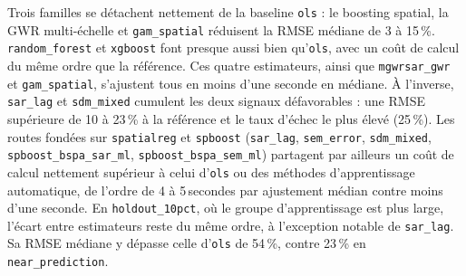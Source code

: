 \documentclass[11pt,a4paper]{article}
\begin{document}
Trois familles se détachent nettement de la baseline \texttt{ols} : le boosting spatial, la GWR multi-échelle et \texttt{gam\_spatial} réduisent la RMSE médiane de 3 à 15\,\%. \texttt{random\_forest} et \texttt{xgboost} font presque aussi bien qu'\texttt{ols}, avec un coût de calcul du même ordre que la référence. Ces quatre estimateurs, ainsi que \texttt{mgwrsar\_gwr} et \texttt{gam\_spatial}, s'ajustent tous en moins d'une seconde en médiane. À l'inverse, \texttt{sar\_lag} et \texttt{sdm\_mixed} cumulent les deux signaux défavorables : une RMSE supérieure de 10 à 23\,\% à la référence et le taux d'échec le plus élevé (25\,\%). Les routes fondées sur \texttt{spatialreg} et \texttt{spboost} (\texttt{sar\_lag}, \texttt{sem\_error}, \texttt{sdm\_mixed}, \texttt{spboost\_bspa\_sar\_ml}, \texttt{spboost\_bspa\_sem\_ml}) partagent par ailleurs un coût de calcul nettement supérieur à celui d'\texttt{ols} ou des méthodes d'apprentissage automatique, de l'ordre de 4 à 5\,secondes par ajustement médian contre moins d'une seconde. En \texttt{holdout\_10pct}, où le groupe d'apprentissage est plus large, l'écart entre estimateurs reste du même ordre, à l'exception notable de \texttt{sar\_lag}. Sa RMSE médiane y dépasse celle d'\texttt{ols} de 54\,\%, contre 23\,\% en \texttt{near\_prediction}.
\end{document}
